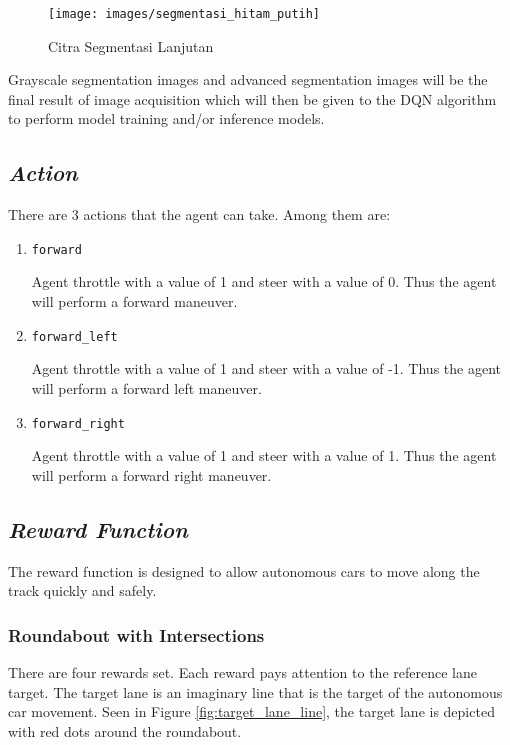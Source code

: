 \documentclass[conference]{IEEEtran}
\begin{document}
\begin{figure}[H] 
	\centering
	\texttt{[image: images/segmentasi\_hitam\_putih]}
	\caption{Citra Segmentasi Lanjutan}
	\label{fig:segmentasi_hitam_putih}
\end{figure}

Grayscale segmentation images and advanced segmentation images will be the final result of image acquisition which will then be given to the DQN algorithm to perform model training and/or inference models.

\subsection{\textit{Action}}
\label{sec:action}
There are 3 actions that the agent can take. Among them are:

\begin{enumerate}
	\item \verb=forward=
	
	Agent throttle with a value of 1 and steer with a value of 0. Thus the agent will perform a forward maneuver.
	
	\item \verb=forward_left=
	
	Agent throttle with a value of 1 and steer with a value of -1. Thus the agent will perform a forward left maneuver.
		
	\item \verb=forward_right=
	
	Agent throttle with a value of 1 and steer with a value of 1. Thus the agent will perform a forward right maneuver.
		
\end{enumerate}

\subsection{\textit{Reward Function}}
\label{sec:sistem_reward}

The reward function is designed to allow autonomous cars to move along the track quickly and safely.

\subsubsection{Roundabout with Intersections}There are four rewards set. Each reward pays attention to the reference lane target. The target lane is an imaginary line that is the target of the autonomous car movement. Seen in Figure  \ref{fig:target_lane_line}, the target lane is depicted with red dots around the roundabout.
\end{document}
